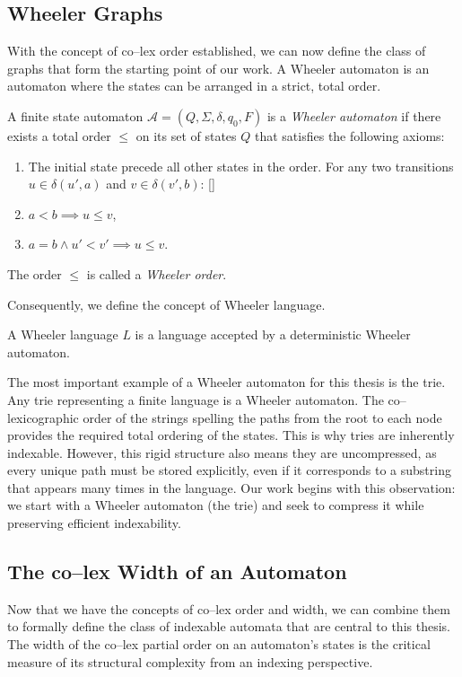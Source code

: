 \subsection{Wheeler Graphs}
With the concept of co--lex order established, we can now define the class of graphs that form the starting point of our work. A Wheeler automaton is an automaton where the states can be arranged in a strict, total order.

\begin{definition}
    \label{def:wheeler_automaton}
    \sloppy
    A finite state automaton $\mathcal{A} = (Q, \Sigma, \delta, q_0, F)$ is a \textit{Wheeler automaton} if there exists a total order $\leq$ on its set of states $Q$ that satisfies the following axioms:
    \begin{enumerate}
        \item The initial state precede all other states in the order.
    For any two transitions $u \in \delta(u', a)$ and $v \in \delta(v', b)$:
    [{}]
        \item $a<b \implies u \leq v$,
        \item $a=b \wedge u' < v' \implies u \leq v$.
    \end{enumerate}
    The order $\leq$ is called a \textit{Wheeler order}.
\end{definition}

Consequently, we define the concept of Wheeler language.
\begin{definition}
    A Wheeler language $L$ is a language accepted by a deterministic Wheeler automaton.
\end{definition}

The most important example of a Wheeler automaton for this thesis is the trie. Any trie representing a finite language is a Wheeler automaton. The co--lexicographic order of the strings spelling the paths from the root to each node provides the required total ordering of the states. This is why tries are inherently indexable. However, this rigid structure also means they are uncompressed, as every unique path must be stored explicitly, even if it corresponds to a substring that appears many times in the language. Our work begins with this observation: we start with a Wheeler automaton (the trie) and seek to compress it while preserving efficient indexability.

\subsection{The co--lex Width of an Automaton}
Now that we have the concepts of co--lex order and width, we can combine them to formally define the class of indexable automata that are central to this thesis. The width of the co--lex partial order on an automaton's states is the critical measure of its structural complexity from an indexing perspective.

